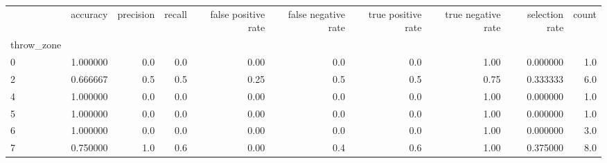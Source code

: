 \begin{tabular}{lrrrrrrrrr}
\toprule
{} &  accuracy &  precision &  recall &  false positive rate &  false negative rate &  true positive rate &  true negative rate &  selection rate &  count \\
throw\_zone &           &            &         &                      &                      &                     &                     &                 &        \\
\midrule
0          &  1.000000 &        0.0 &     0.0 &                 0.00 &                  0.0 &                 0.0 &                1.00 &        0.000000 &    1.0 \\
2          &  0.666667 &        0.5 &     0.5 &                 0.25 &                  0.5 &                 0.5 &                0.75 &        0.333333 &    6.0 \\
4          &  1.000000 &        0.0 &     0.0 &                 0.00 &                  0.0 &                 0.0 &                1.00 &        0.000000 &    1.0 \\
5          &  1.000000 &        0.0 &     0.0 &                 0.00 &                  0.0 &                 0.0 &                1.00 &        0.000000 &    1.0 \\
6          &  1.000000 &        0.0 &     0.0 &                 0.00 &                  0.0 &                 0.0 &                1.00 &        0.000000 &    3.0 \\
7          &  0.750000 &        1.0 &     0.6 &                 0.00 &                  0.4 &                 0.6 &                1.00 &        0.375000 &    8.0 \\
\bottomrule
\end{tabular}
